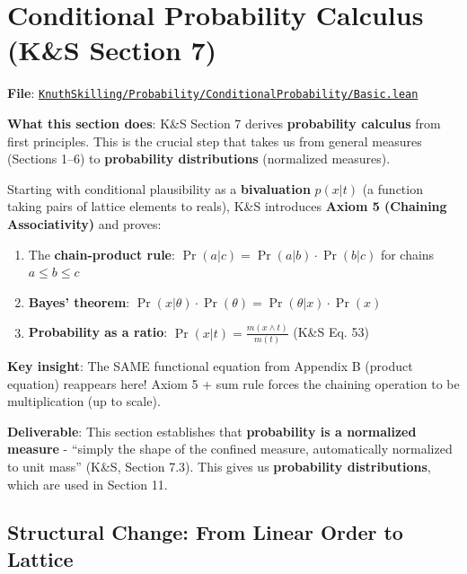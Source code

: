 \documentclass[11pt]{article}
\theoremstyle{definition}
\theoremstyle{remark}
\begin{document}
\section{Conditional Probability Calculus (K\&S Section 7)}

\textbf{File}: \href{https://github.com/zariuq/ks-foundations-of-inference/blob/main/KnuthSkilling/Probability/ConditionalProbability/Basic.lean}{\texttt{KnuthSkilling/Probability/ConditionalProbability/Basic.lean}}

\textbf{What this section does}: K\&S Section 7 derives \textbf{probability calculus} from first principles. This is the crucial step that takes us from general measures (Sections 1--6) to \textbf{probability distributions} (normalized measures).

Starting with conditional plausibility as a \textbf{bivaluation} $p(x|t)$ (a function taking pairs of lattice elements to reals), K\&S introduces \textbf{Axiom 5 (Chaining Associativity)} and proves:

\begin{enumerate}
\item The \textbf{chain-product rule}: $\Pr(a|c) = \Pr(a|b) \cdot \Pr(b|c)$ for chains $a \leq b \leq c$
\item \textbf{Bayes' theorem}: $\Pr(x|\theta) \cdot \Pr(\theta) = \Pr(\theta|x) \cdot \Pr(x)$
\item \textbf{Probability as a ratio}: $\Pr(x|t) = \frac{m(x \wedge t)}{m(t)}$ (K\&S Eq. 53)
\end{enumerate}

\textbf{Key insight}: The SAME functional equation from Appendix B (product equation) reappears here! Axiom 5 + sum rule forces the chaining operation to be multiplication (up to scale).

\textbf{Deliverable}: This section establishes that \textbf{probability is a normalized measure} - ``simply the shape of the confined measure, automatically normalized to unit mass'' (K\&S, Section 7.3). This gives us \textbf{probability distributions}, which are used in Section 11.

\subsection{Structural Change: From Linear Order to Lattice}
\end{document}
